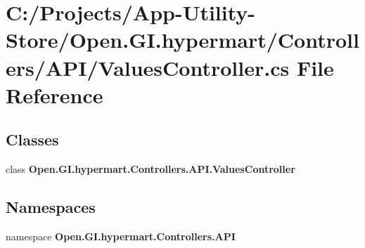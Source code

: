\section{C\+:/\+Projects/\+App-\/\+Utility-\/\+Store/\+Open.G\+I.\+hypermart/\+Controllers/\+A\+P\+I/\+Values\+Controller.cs File Reference}
\label{_values_controller_8cs}
\subsection*{Classes}
\begin{DoxyCompactItemize}
\item 
class \textbf{ Open.\+G\+I.\+hypermart.\+Controllers.\+A\+P\+I.\+Values\+Controller}
\end{DoxyCompactItemize}
\subsection*{Namespaces}
\begin{DoxyCompactItemize}
\item 
namespace \textbf{ Open.\+G\+I.\+hypermart.\+Controllers.\+A\+PI}
\end{DoxyCompactItemize}
